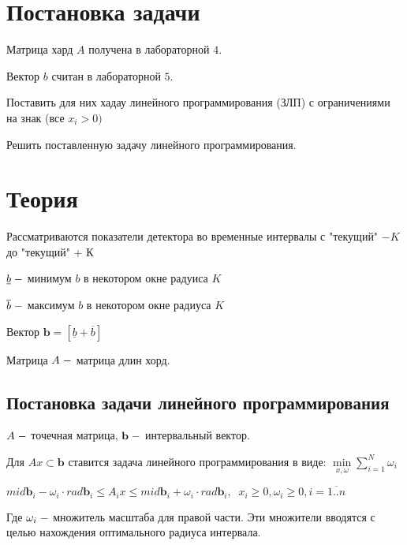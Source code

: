 \documentclass[a4]{article}
\renewcommand{\listoffigures}{\begingroup %
\tocsection
\tocfile{\listfigurename}{lof}
\endgroup}
\begin{document}
\newpage
\pagestyle{plain}



\newpage
\tableofcontents{}
\newpage
\listoffigures{}
\newpage

\section{Постановка задачи}
Матрица хард $A$ получена в лабораторной $4.$

Вектор $b$ считан в лабораторной $5.$

Поставить для них хадау линейного программирования (ЗЛП) с ограничениями на знак (все $x_i > 0)$

Решить поставленную задачу линейного программирования.


\section{Теория}

Рассматриваются показатели детектора во временные интервалы с "текущий" $ \minus K$ до "текущий" + К

$\underline b\;\--$ минимум $b$ в некотором окне радуиса $K$

$\overline b\;\--$ максимум $b$ в некотором окне радиуса $K$

Вектор $\mathbf{b}=[\underline b+\overline b]$

Матрица $A\;\--$ матрица длин хорд.

\subsection{Постановка задачи линейного программирования}
$A\;\--$ точечная матрица, $\mathbf{b}\;\--$ интервальный вектор.

Для $Ax\subset\mathbf{b}$ ставится задача линейного программирования в виде: $\min\limits_{x,\omega}\sum\limits_{i=1}^N\omega_i$

$mid \mathbf{b}_i-\omega_i\cdot rad \mathbf{b}_i\leq A_ix\leq mid \mathbf{b}_i+\omega_i\cdot rad \mathbf{b}_i,\;\;x_i\geq 0, \omega_i\geq 0, i=\overline{1..n}$

Где $\omega_i\;\--$ множитель масштаба для правой части. Эти множители вводятся с целью нахождения оптимального радиуса интервала.
\end{document}
